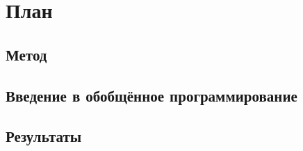 \section{План}



\subsection{Метод}

\subsection{Введение в обобщённое программирование}
%

\subsection{Результаты}
%


%
%
%


